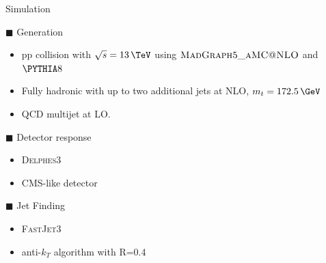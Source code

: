 
\begin{frame}[fragile]{Simulation}
    \begin{block}{$\blacksquare$ Generation}
        \smallskip
        \begin{itemize}
          \item pp collision with $\sqrt{s}=13\,\TeV$ using $\textsc{MadGraph5\_aMC@NLO}$ and ${\PYTHIA}8$
            \item Fully hadronic \ttbar with up to two additional jets at NLO, $m_{t}=172.5\,\GeV$
            \item QCD multijet at LO.
        \end{itemize}
    \end{block}
    \medskip
    \begin{block}{$\blacksquare$ Detector response}
        \smallskip
        \begin{itemize}
            \item \textsc{Delphes3}
            \item CMS-like detector
        \end{itemize}
    \end{block}
    \begin{block}{$\blacksquare$ Jet Finding}
        \smallskip
        \begin{itemize}
            \item \textsc{FastJet3}
            \item anti-$k_{T}$ algorithm with R=0.4
        \end{itemize}
    \end{block}
\end{frame}

